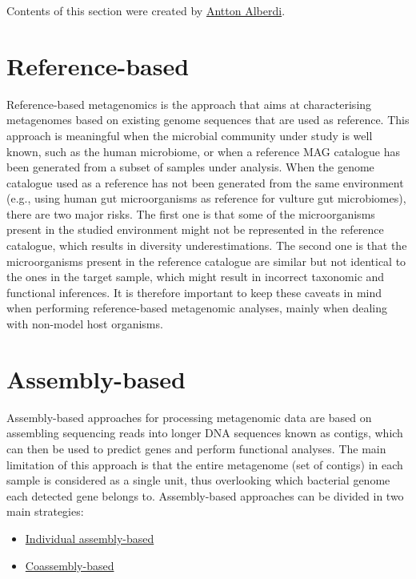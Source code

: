 \documentclass[
]{book}
\providecommand{\tightlist}{%
  \setlength{\itemsep}{0pt}\setlength{\parskip}{0pt}}
\begin{document}
Contents of this section were created by \protect\hyperlink{antton-alberdi}{Antton Alberdi}.

\hypertarget{reference-based}{%
\section{Reference-based}\label{reference-based}}

Reference-based metagenomics is the approach that aims at characterising metagenomes based on existing genome sequences that are used as reference. This approach is meaningful when the microbial community under study is well known, such as the human microbiome, or when a reference MAG catalogue has been generated from a subset of samples under analysis. When the genome catalogue used as a reference has not been generated from the same environment (e.g., using human gut microorganisms as reference for vulture gut microbiomes), there are two major risks. The first one is that some of the microorganisms present in the studied environment might not be represented in the reference catalogue, which results in diversity underestimations. The second one is that the microorganisms present in the reference catalogue are similar but not identical to the ones in the target sample, which might result in incorrect taxonomic and functional inferences. It is therefore important to keep these caveats in mind when performing reference-based metagenomic analyses, mainly when dealing with non-model host organisms.

\hypertarget{assembly-based}{%
\section{Assembly-based}\label{assembly-based}}

Assembly-based approaches for processing metagenomic data are based on assembling sequencing reads into longer DNA sequences known as contigs, which can then be used to predict genes and perform functional analyses. The main limitation of this approach is that the entire metagenome (set of contigs) in each sample is considered as a single unit, thus overlooking which bacterial genome each detected gene belongs to. Assembly-based approaches can be divided in two main strategies:

\begin{itemize}
\tightlist
\item
  \protect\hyperlink{individual-assembly-based}{Individual assembly-based}
\item
  \protect\hyperlink{coassembly-based}{Coassembly-based}
\end{itemize}
\end{document}
